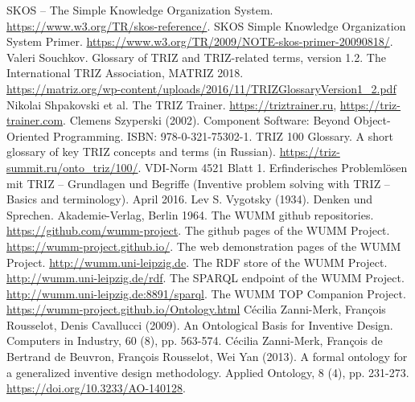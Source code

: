\documentclass[11pt,a4paper]{article}
\begin{document}
\begin{thebibliography}{xxx}
 SKOS -- The Simple Knowledge Organization System.
  \url{https://www.w3.org/TR/skos-reference/}.  
 SKOS Simple Knowledge Organization System Primer.
  \url{https://www.w3.org/TR/2009/NOTE-skos-primer-20090818/}.  
 Valeri Souchkov. Glossary of TRIZ and TRIZ-related
  terms, version 1.2.  The International TRIZ Association, MATRIZ
  2018.\\ \url{https://matriz.org/wp-content/uploads/2016/11/TRIZGlossaryVersion1_2.pdf}
 Nikolai Shpakovski et al. The TRIZ Trainer.
  \url{https://triztrainer.ru}, \url{https://triz-trainer.com}.
 Clemens Szyperski (2002). Component Software: Beyond
  Object-Oriented Programming. ISBN: 978-0-321-75302-1.
 TRIZ 100 Glossary. A short glossary of key TRIZ
  concepts and terms (in Russian).
  \url{https://triz-summit.ru/onto_triz/100/}.
 VDI-Norm 4521 Blatt 1. Erfinderisches Problemlösen mit TRIZ --
  Grundlagen und Begriffe (Inventive problem solving with TRIZ -- Basics and
  terminology). April 2016.
 Lev S. Vygotsky (1934). Denken und Sprechen.
  Akademie-Verlag, Berlin 1964.
 The WUMM github repositories.
  \url{https://github.com/wumm-project}. 
 The github pages of the WUMM Project.
  \url{https://wumm-project.github.io/}. 
 The web demonstration pages of the WUMM Project.
  \url{http://wumm.uni-leipzig.de}.
 The RDF store of the WUMM Project.
  \url{http://wumm.uni-leipzig.de/rdf}.
 The SPARQL endpoint of the WUMM Project.
  \url{http://wumm.uni-leipzig.de:8891/sparql}.
 The WUMM TOP Companion Project.
  \url{https://wumm-project.github.io/Ontology.html}
 Cécilia Zanni-Merk, Fran\c{c}ois Rousselot, Denis
  Cavallucci (2009). An Ontological Basis for Inventive Design. Computers in
  Industry, 60 (8), pp. 563-574.
 Cécilia Zanni-Merk, Fran\c{c}ois de Bertrand de Beuvron,
  Fran\c{c}ois Rousselot, Wei Yan (2013). A formal ontology for a generalized
  inventive design methodology.  Applied Ontology, 8 (4), pp. 231-273.
  \url{https://doi.org/10.3233/AO-140128}.
\end{thebibliography}


   
   
    
\end{document}
